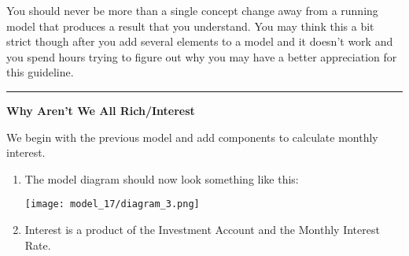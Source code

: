 \documentclass[]{memoir}
\makeatletter
\def\maxwidth{\ifdim\Gin@nat@width>\linewidth\linewidth
\else\Gin@nat@width\fi}
\let\Oldincludegraphics\includegraphics
\renewcommand{\includegraphics}[1]{\Oldincludegraphics[width=\maxwidth]{#1}}
\makeatother
\begin{document}
You should never be more than a single concept change away from a
running model that produces a result that you understand. You may think
this a bit strict though after you add several elements to a model and
it doesn't work and you spend hours trying to figure out why you may
have a better appreciation for this guideline.

\begin{center}\rule{3in}{0.4pt}\end{center}

\FloatBarrier 

\begin{oframed}\textbf{Why Aren't We All Rich/Interest} 

 We begin with the previous model and add components to calculate monthly interest.

\begin{enumerate}
\item The model diagram should now look something like this: \par \begin{minipage}{\linewidth}  \centering \texttt{[image: model\_17/diagram\_3.png]}
\end{minipage}
\item 

Interest is a product of the Investment Account and the Monthly Interest Rate.



\end{enumerate}
\end{oframed}
\end{document}
